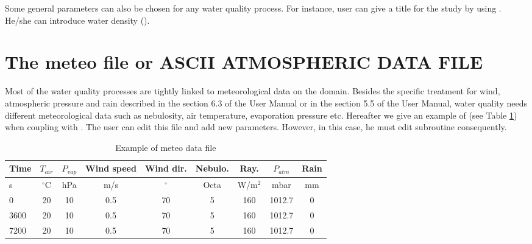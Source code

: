 Some general parameters can also be chosen for any water quality process.
For instance, user can give a title for the study by using .
He/she can introduce water density ().


\section{The meteo file or ASCII ATMOSPHERIC DATA FILE}
\label{subs:meteo:file}
Most of the water quality processes are tightly linked to
meteorological data on the domain.
Besides the specific treatment for wind, atmospheric pressure
and rain described in the section 6.3 of the  User Manual
or in the section 5.5 of the  User Manual,
water quality needs different meteorological data such as
nebulosity, air temperature, evaporation pressure etc.
Hereafter we give an example of 
(see Table \ref{tab:meteo}) when coupling with .
The user can edit this file and add new parameters.
However, in this case, he must edit subroutine  consequently.

\begin{table}
    \centering
  \begin{tabular}{|l|c|c|c|c|c|c|c|c|}
     \hline \hline
     Time & $T_{air}$ & $P_{vap}$ & Wind speed & Wind dir. & Nebulo. & Ray. & $P_{atm}$ & Rain \\
     \hline \hline
     s & $^\circ$C & hPa & m/s & $^\circ$ & Octa & W/m$^2$ & mbar & mm \\
     \hline \hline
     0 & 20 & 10 & 0.5 & 70 & 5 & 160 & 1012.7 & 0 \\
     3600 & 20 & 10 & 0.5 & 70 & 5 & 160 & 1012.7 & 0 \\
     7200 & 20 & 10 & 0.5 & 70 & 5 & 160 & 1012.7 & 0 \\
     \hline
   \end{tabular}
  \caption{Example of meteo data file }\label{tab:meteo}
\end{table}
